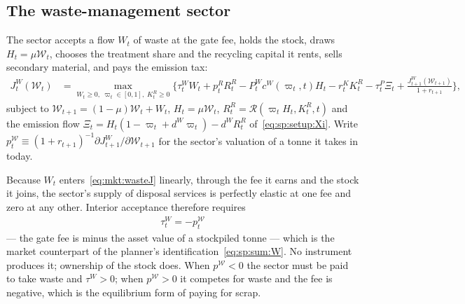 \subsection{The waste-management sector}\label{sec:mkt:eq:waste}

The sector accepts a flow $W_t$ of waste at the gate fee, holds the stock, draws $H_t=\mu\mathcal W_t$, chooses the treatment share and the recycling capital it rents, sells secondary material, and pays the emission tax:
\begin{align}
J^W_t\left(\mathcal W_t\right) &= \max_{W_t\ge0,\;\varpi_t\in\left[0,1\right],\;K^R_t\ge0}
\Big\{\tau^W_tW_t+p^R_tR^R_t-P^W_tc^W\!\left(\varpi_t,t\right)H_t-r^K_tK^R_t-\tau^P_t\Xi_t
+\frac{J^W_{t+1}\left(\mathcal W_{t+1}\right)}{1+r_{t+1}}\Big\},
\label{eq:mkt:wasteJ}
\end{align}
subject to $\mathcal W_{t+1}=\left(1-\mu\right)\mathcal W_t+W_t$, $H_t=\mu\mathcal W_t$, $R^R_t=\mathcal R\left(\varpi_tH_t,K^R_t,t\right)$ and the emission flow $\Xi_t=H_t\left(1-\varpi_t+d^W\varpi_t\right)-d^WR^R_t$ of~\eqref{eq:sp:setup:Xi}. Write $p^{\mathcal W}_t\equiv\left(1+r_{t+1}\right)^{-1}\partial J^W_{t+1}/\partial\mathcal W_{t+1}$ for the sector's valuation of a tonne it takes in today.

 Because $W_t$ enters~\eqref{eq:mkt:wasteJ} linearly, through the fee it earns and the stock it joins, the sector's supply of disposal services is perfectly elastic at one fee and zero at any other. Interior acceptance therefore requires
\begin{align}
\boxed{\;\tau^W_t = -p^{\mathcal W}_t\;}
\label{eq:mkt:gatefee}
\end{align}
--- the gate fee is minus the asset value of a stockpiled tonne --- which is the market counterpart of the planner's identification~\eqref{eq:sp:sum:W}. No instrument produces it; ownership of the stock does. When $p^{\mathcal W}<0$ the sector must be paid to take waste and $\tau^W>0$; when $p^{\mathcal W}>0$ it competes for waste and the fee is negative, which is the equilibrium form of paying for scrap.

